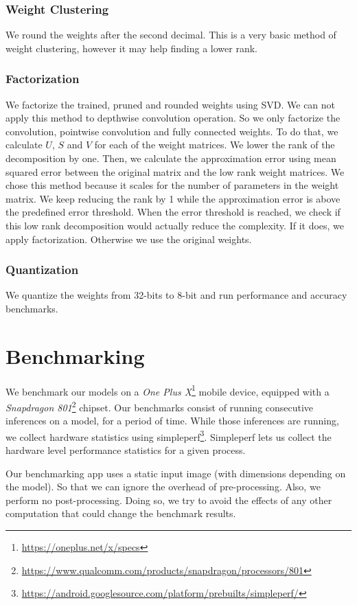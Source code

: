 \subsubsection{Weight Clustering}
We round the weights after the second decimal. This is a very basic method of weight clustering, however it may help finding a lower rank. 

\subsubsection{Factorization}
We factorize the trained, pruned and rounded weights using SVD. We can not apply this method to depthwise convolution operation. So we only factorize the convolution, pointwise convolution and fully connected weights. To do that, we calculate $U$, $S$ and $V$ for each of the weight matrices. We lower the rank of the decomposition by one. Then, we calculate the approximation error using mean squared error between the original matrix and the low rank weight matrices. We chose this method because it scales for the number of parameters in the weight matrix. We keep reducing the rank by 1 while the approximation error is above the predefined error threshold. When the error threshold is reached, we check if this low rank decomposition would actually reduce the complexity. If it does, we apply factorization. Otherwise we use the original weights.

\subsubsection{Quantization}
We quantize the weights from 32-bits to 8-bit and run performance and accuracy benchmarks.

\iffalse
\section{Benchmarking}
We benchmark our models on a \textit{One Plus X}\footnote{\url{https://oneplus.net/x/specs}} mobile device, equipped with a \textit{Snapdragon 801}\footnote{\url{https://www.qualcomm.com/products/snapdragon/processors/801}} chipset. Our benchmarks consist of running consecutive inferences on a model, for a period of time. While those inferences are running, we collect hardware statistics using simpleperf\footnote{\url{https://android.googlesource.com/platform/prebuilts/simpleperf/}}. Simpleperf lets us collect the hardware level performance statistics for a given process.

Our benchmarking app uses a static input image (with dimensions depending on the model). So that we can ignore the overhead of pre-processing. Also, we perform no post-processing. Doing so, we try to avoid the effects of any other computation that could change the benchmark results. 

